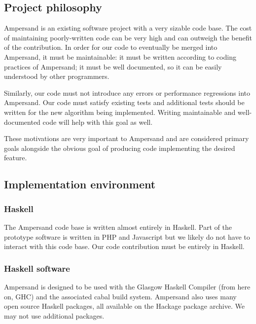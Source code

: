 \documentclass[12pt]{report}
\begin{document}
\subsection{Project philosophy}

Ampersand is an existing software project with a very sizable code base. The
cost of maintaining poorly-written code can be very high and can outweigh the
benefit of the contribution. In order for our code to eventually be merged into
Ampersand, it must be maintainable: it must be written according to coding
practices of Ampersand; it must be well documented, so it can be easily
understood by other programmers. 

Similarly, our code must not introduce any errors or performance regressions
into Ampersand. Our code must satisfy existing tests and additional tests should
be written for the new algorithm being implemented. Writing maintainable and
well-documented code will help with this goal as well.

These motivations are very important to Ampersand and are considered primary
goals alongside the obvious goal of producing code implementing the desired
feature.

\subsection{Implementation environment}
\subsubsection*{Haskell}
The Ampersand code base is written almost entirely in Haskell. Part of the
prototype software is written in PHP and Javascript %
but we likely do not have to interact with this code base. Our code contribution
must be entirely in Haskell.

\subsubsection*{Haskell software}
Ampersand is designed to be used with the Glasgow Haskell Compiler (from here on, GHC) %
and the associated cabal build system. %
Ampersand also uses many open source Haskell packages, all available on the
Hackage package archive. %
We may not use additional packages. %
\end{document}
